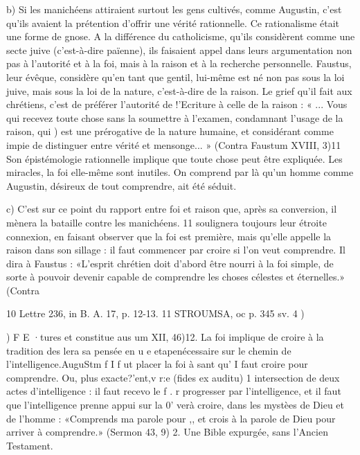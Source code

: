 b)	Si les manichéens attiraient surtout les gens cultivés, comme Augustin, c'est qu'ils avaient la prétention d'offrir une vérité rationnelle. Ce rationalisme était une forme de gnose. A la différence du catholicisme, qu'ils considèrent comme une secte juive (c'est-à-dire païenne), ils faisaient appel dans leurs argumentation non pas à l'autorité et à la foi, mais à la raison et à la recherche personnelle. Faustus, leur évêque, considère qu'en tant que gentil, lui-même est né non pas sous la loi juive, mais sous la loi de la nature, c'est-à-dire de la raison. Le grief qu'il fait aux chrétiens, c'est de préférer l'autorité de !'Ecriture à celle de la raison : « ... Vous qui recevez toute chose sans la soumettre à l'examen, condamnant l'usage de la raison, qui
)	est une prérogative de la nature humaine, et considérant comme impie de distinguer entre vérité et mensonge... » (Contra Faustum XVIII, 3)11  Son épistémologie rationnelle
implique que toute chose peut être expliquée. Les miracles, la foi elle-même sont inutiles. On comprend par là qu'un homme comme Augustin, désireux de tout comprendre, ait été séduit.

c)	C'est sur ce point du rapport  entre  foi  et  raison que, après sa conversion, il mènera la bataille contre les manichéens. 11 soulignera toujours leur étroite connexion, en faisant observer que la foi est première, mais qu'elle appelle la raison dans son sillage : il faut commencer par croire si l'on veut comprendre. Il dira à Faustus :  «L'esprit chrétien doit d'abord être nourri à la foi simple, de sorte à pouvoir devenir capable de comprendre les choses célestes et éternelles.» (Contra



10 Lettre 236, in B. A. 17, p. 12-13.
11 STROUMSA, oc p. 345 sv.
4
)
 
 





)
F	E	·tures et constitue
aus um XII, 46)12. La foi implique de croire à la tradition des  lera sa pensée en u e etapenécessaire sur le chemin de l'intelligence.AuguStm f I f	ut	placer la foi à sant qu' I faut croire pour comprendre. Ou, plus exacte?'ent,v r:e (fides ex auditu)
1 intersection de deux actes d'intelligence : il faut recevo  le	f	.	r	progresser
par l'intelligence, et il faut que l'intelligence prenne appui sur la 0'	verà croire, dans les mystèes de Dieu et de l'homme : «Comprends ma parole pour	,,
et crois à la parole de Dieu pour arriver à comprendre.» (Sermon 43, 9)
2.	Une Bible expurgée, sans l'Ancien Testament.

